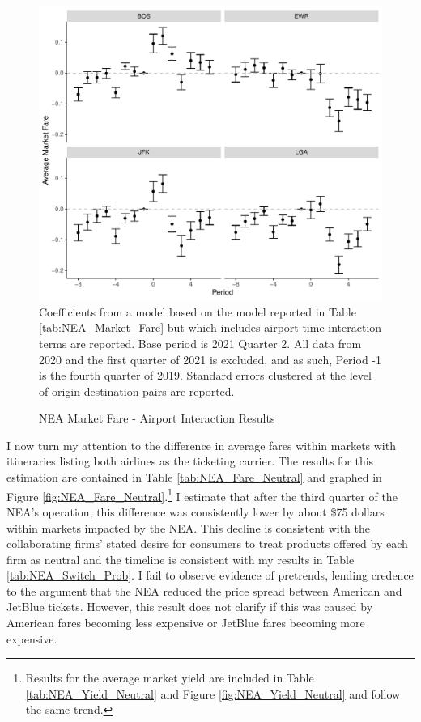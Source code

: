 \documentclass{article}
\begin{document}
    \begin{figure}
		\caption{NEA Market Fare - Airport Interaction Results}
		\label{fig:NEA_Airport_Fare_Interaction}
		\includegraphics[width = \linewidth]{NEA_Airport_Fare_Graph}
		\footnotesize{Coefficients from a model based on the model reported in Table \ref{tab:NEA_Market_Fare} but which includes airport-time interaction terms are reported. Base period is 2021 Quarter 2. All data from 2020 and the first quarter of 2021 is excluded, and as such, Period -1 is the fourth quarter of 2019. Standard errors clustered at the level of origin-destination pairs are reported. }
	\end{figure}
    
	 I now turn my attention to the difference in average fares within markets with itineraries listing both airlines as the ticketing carrier. The results for this estimation are contained in Table \ref{tab:NEA_Fare_Neutral} and graphed in Figure \ref{fig:NEA_Fare_Neutral}.\footnote{Results for the average market yield are included in Table \ref{tab:NEA_Yield_Neutral} and Figure \ref{fig:NEA_Yield_Neutral} and follow the same trend.} I estimate that after the third quarter of the NEA's operation, this difference was consistently lower by about \$75 dollars within markets impacted by the NEA. This decline is consistent with the collaborating firms' stated desire for consumers to treat products offered by each firm as neutral and the timeline is consistent with my results in Table \ref{tab:NEA_Switch_Prob}. I fail to observe evidence of pretrends, lending credence to the argument that the NEA reduced the price spread between American and JetBlue tickets. However, this result does not clarify if this was caused by American fares becoming less expensive or JetBlue fares becoming more expensive. 	
\end{document}
